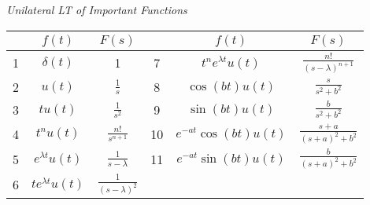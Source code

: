\documentclass[twocolumn]{article}
\begin{document}
\dotfill


\begin{table*}[h!]
    \centering
    \textit{Unilateral LT of Important Functions} \\[1em]

    \begin{tabular}{c| cc |c| cc}
        \toprule
        & $f(t)$ & $F(s)$ & & $f(t)$ & $F(s)$ \\
        \midrule
        1 & $\delta(t)$ & 1 & 7 & $t^n e^{\lambda t} u(t)$ & $\frac{n!}{(s-\lambda)^{n+1}}$ \\[1em]
        2 & $u(t)$ & $\frac{1}{s}$ & 8 & $\cos(bt) u(t)$ & $\frac{s}{s^2 + b^2}$ \\[1em]
        3 & $tu(t)$ & $\frac{1}{s^2}$ & 9 & $\sin(bt) u(t)$ & $\frac{b}{s^2+b^2}$ \\[1em]
        4 & $t^n u(t)$ & $\frac{n!}{s^{n+1}}$ & 10 & $e^{-at} \cos(bt) u(t)$ & $\frac{s+a}{(s+a)^2 + b^2}$ \\[1em]
        5 & $e^{\lambda t} u(t)$ & $\frac{1}{s-\lambda}$ & 11 & $e^{-at} \sin(bt) u(t)$ & $\frac{b}{(s+a)^2 + b^2}$ \\[1em]
        6 & $t e^{\lambda t} u(t)$ & $\frac{1}{(s-\lambda)^2}$ & \\[1em]
        \bottomrule
    \end{tabular}
\end{table*}
\end{document}
